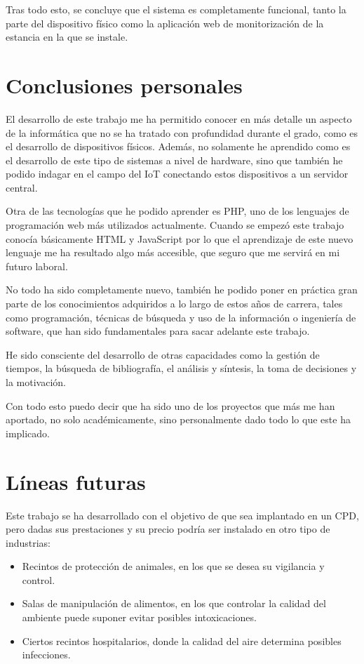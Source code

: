 Tras todo esto, se concluye que el sistema es completamente funcional, tanto la parte del dispositivo físico como la aplicación web de monitorización de la estancia en la que se instale.

\section{Conclusiones personales}\label{sec:conclusiones-personales}
El desarrollo de este trabajo me ha permitido conocer en más detalle un aspecto de la informática que no se ha tratado con profundidad durante el grado, como es el desarrollo de dispositivos físicos. Además, no solamente he aprendido como es el desarrollo de este tipo de sistemas a nivel de hardware, sino que también he podido indagar en el campo del IoT conectando estos dispositivos a un servidor central.

Otra de las tecnologías que he podido aprender es PHP, uno de los lenguajes de programación web más utilizados actualmente. Cuando se empezó este trabajo conocía básicamente HTML y JavaScript por lo que el aprendizaje de este nuevo lenguaje me ha resultado algo más accesible, que seguro que me servirá en mi futuro laboral.

No todo ha sido completamente nuevo, también he podido poner en práctica gran parte de los conocimientos adquiridos a lo largo de estos años de carrera, tales como programación, técnicas de búsqueda y uso de la información o ingeniería de software, que han sido fundamentales para sacar adelante este trabajo.

He sido consciente del desarrollo de otras capacidades como la gestión de tiempos, la búsqueda de bibliografía, el análisis y síntesis, la toma de decisiones y la motivación.

Con todo esto puedo decir que ha sido uno de los proyectos que más me han aportado, no solo académicamente, sino personalmente dado todo lo que este ha implicado.

\section{Líneas futuras}\label{sec:líneas-futuras}
Este trabajo se ha desarrollado con el objetivo de que sea implantado en un CPD, pero dadas sus prestaciones y su precio podría ser instalado en otro tipo de industrias:
\begin{itemize}
	\item Recintos de protección de animales, en los que se desea su vigilancia y control.
	\item Salas de manipulación de alimentos, en los que controlar la calidad del ambiente puede suponer evitar posibles  intoxicaciones.
	\item Ciertos recintos hospitalarios, donde la calidad del aire determina posibles infecciones.
\end{itemize}

